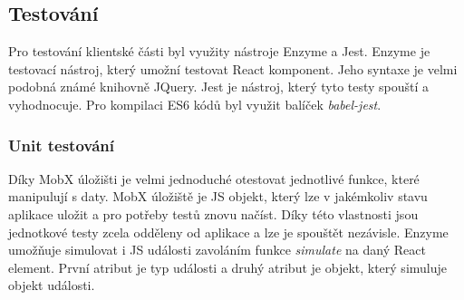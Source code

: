\documentclass[a4paper,11pt,titlepage,fleqn]{article}
\begin{document}


    \subsection{Testování}
        Pro testování  klientské části byl využity nástroje Enzyme a Jest. Enzyme je testovací nástroj, který umožní testovat React komponent. Jeho syntaxe je velmi podobná známé knihovně JQuery. Jest je nástroj, který tyto testy spouští a vyhodnocuje. Pro kompilaci ES6 kódů byl využit balíček \textit{babel-jest}. 

        \subsubsection{Unit testování}
            Díky MobX úložišti je velmi jednoduché otestovat jednotlivé funkce, které manipulují s daty. MobX úložiště je JS objekt, který lze v jakémkoliv stavu aplikace uložit a pro potřeby testů znovu načíst. Díky této vlastnosti jsou jednotkové testy zcela odděleny od aplikace a lze je spouštět nezávisle. Enzyme umožňuje simulovat i JS události zavoláním funkce \textit{simulate} na daný React element. První atribut je typ události a druhý atribut je objekt, který simuluje objekt události.
\end{document}
